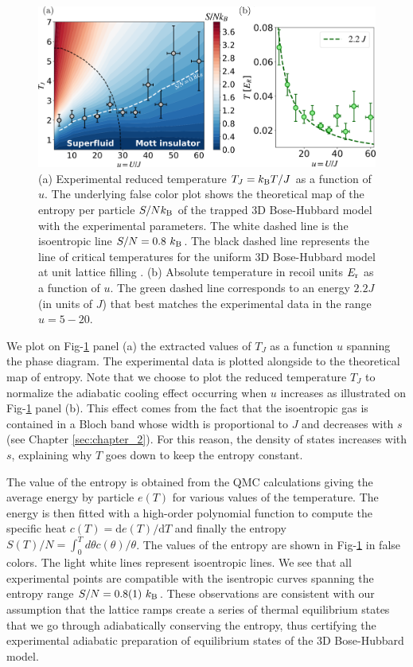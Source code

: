 \begin{figure}
    \centering
    \includegraphics[width=\textwidth]{Fig/Chapter3/temperature.png}
    \caption[Experimental reduced temperature $T_J=\kB T/J$ as a function of $u$ and absolute temperature in recoil units $E_{\rm{r}}$ as a function of $u$]{(a) Experimental reduced temperature $T_J=\kB T/J$ as a function of $u$. The underlying false color plot shows the theoretical map of the entropy per particle $S/N k_{\mathrm{B}}$ of the trapped 3D Bose-Hubbard model with the experimental parameters. The white dashed line is the isoentropic line $S/N=0.8 \ \kB$. The black dashed line represents the line of critical temperatures for the uniform 3D Bose-Hubbard model at unit lattice filling \cite{capogrosso2007phase}. (b) Absolute temperature in recoil units $E_{\rm{r}}$ as a function of $u$. The green dashed line corresponds to an energy $2.2 J$ (in units of $J$) that best matches the experimental data in the range $u=5-20$.}
    \label{fig:T_vs_u}
\end{figure}

We plot on Fig-\ref{fig:T_vs_u} panel (a) the extracted values of $T_J$ as a function $u$ spanning the phase diagram. The experimental data is plotted alongside to the theoretical map of entropy. Note that we choose to plot the reduced temperature $T_J$ to normalize the adiabatic cooling effect occurring when $u$ increases as illustrated on Fig-\ref{fig:T_vs_u} panel (b). This effect comes from the fact that the isoentropic gas is contained in a Bloch band whose width is proportional to $J$ and decreases with $s$ (see Chapter \ref{sec:chapter_2}). For this reason, the density of states increases with $s$, explaining why $T$ goes down to keep the entropy constant.

The value of the entropy is obtained from the QMC calculations giving the average energy by particle $e(T)$ for various values of the temperature. The energy is then fitted with a high-order polynomial function to compute the specific heat $c(T)=\mathrm{d} e(T) / \mathrm{d} T$ and finally the entropy $S(T) / N=\int_{0}^{T} d \theta c(\theta) / \theta$. The values of the entropy are shown in Fig-\ref{fig:T_vs_u} in false colors. The light white lines represent isoentropic lines. We see that all experimental points are compatible with the isentropic curves spanning the entropy range $S/N= 0.8(1) \ \kB$. These observations are consistent with our assumption that the lattice ramps create a series of thermal equilibrium states that we go through adiabatically conserving the entropy, thus certifying the experimental adiabatic preparation of equilibrium states of the 3D Bose-Hubbard model.

